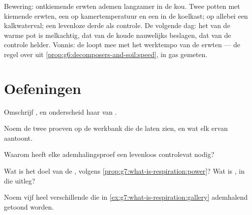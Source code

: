 \begin{example}\label{ex:g7:what-is-respiration:coldseed}
Bewering: ontkiemende erwten ademen langzamer in de kou. Twee potten met
kiemende erwten, een op kamertemperatuur en een in de koelkast; op
allebei een kalkwaterval; een levenloze derde als controle. De volgende
dag: het  van de warme pot is melkachtig, dat van de koude
nauwelijks beslagen, dat van de controle helder. Vonnis: de 
loopt mee met het werktempo van de erwten --- de regel over
 uit \cref{prop:g6:decomposers-and-soil:speed}, in gas
gemeten.
\end{example}

\section{Oefeningen}

\begin{exercise}[$\star$]\label{exo:g7:what-is-respiration:1}
Omschrijf , en onderscheid haar van .
\end{exercise}

\begin{exercise}[$\star$]\label{exo:g7:what-is-respiration:2}
Noem de twee proeven op de werkbank die de  laten zien, en wat
elk ervan aantoont.
\end{exercise}

\begin{exercise}[$\star$]\label{exo:g7:what-is-respiration:3}
Waarom heeft elke ademhalingsproef een levenloos controlevat nodig?
\end{exercise}

\begin{exercise}[$\star$]\label{exo:g7:what-is-respiration:4}
Wat is het doel van de , volgens
\cref{prop:g7:what-is-respiration:power}? Wat is , in die
uitleg?
\end{exercise}

\begin{exercise}[$\star$]\label{exo:g7:what-is-respiration:5}
Noem vijf heel verschillende  die in
\cref{ex:g7:what-is-respiration:gallery} ademhalend getoond worden.
\end{exercise}

